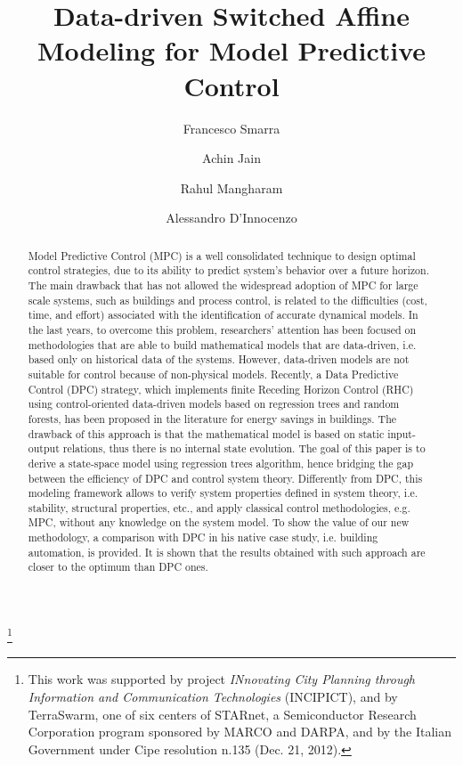 \documentclass[letterpaper, 10 pt, conference]{ifacconf}  %
\begin{document}
\begin{frontmatter}
	
	\title{Data-driven Switched Affine Modeling for Model Predictive Control} 
	
	\thanks[footnoteinfo]{This work was supported by project \emph{INnovating City Planning through Information and Communication Technologies} (INCIPICT), and by TerraSwarm, one of six centers of STARnet, a Semiconductor Research Corporation program sponsored by MARCO and DARPA, and by the Italian Government under Cipe resolution n.135 (Dec. 21, 2012).}
	
	\author[First,Second]{Francesco Smarra} 
	\author[Second]{Achin Jain} 
	\author[Second]{Rahul Mangharam}
	\author[First]{Alessandro D'Innocenzo}
	
	\address[First]{Department of Information Engineering, Computer Science and Mathematics, University of L'Aquila, Via Vetoio, Coppito, 67100 L'Aquila, Italy \\(e-mail: [francesco.smarra,alessandro.dinnocenzo]@univaq.it).}
	\address[Second]{Department of Electrical and Systems Engineering, University of Pennsylvania, 200 South 33rd Street, 19104 Philadelphia, PA, USA (e-mail: [achinj,rahulm]@seas.upenn.edu)}

\begin{abstract}
Model Predictive Control (MPC) is a well consolidated technique to design optimal control strategies, due to its ability to predict system’s behavior over a future horizon. The main drawback that has not allowed the widespread adoption of MPC for large scale systems, such as buildings and process control, is related to the difficulties (cost, time, and effort) associated with the identification of accurate dynamical models. In the last years, to overcome this problem, researchers' attention has been focused on methodologies that are able to build mathematical models that are data-driven, i.e. based only on historical data of the systems. However, data-driven models are not suitable for control because of non-physical models. Recently, a Data Predictive Control (DPC) strategy, which implements finite Receding Horizon Control (RHC) using control-oriented data-driven models based on regression trees and random forests, has been proposed in the literature for energy savings in buildings. The drawback of this approach is that the mathematical model is based on static input-output relations, thus there is no internal state evolution. The goal of this paper is to derive a state-space model using regression trees algorithm, hence bridging the gap between the efficiency of DPC and control system theory. Differently from DPC, this modeling framework allows to verify system properties defined in system theory, i.e. stability, structural properties, etc., and apply classical control methodologies, e.g. MPC, without any knowledge on the system model. To show the value of our new methodology, a comparison with DPC in his native case study, i.e. building automation, is provided. It is shown that the results obtained with such approach are closer to the optimum than DPC ones.
\end{abstract}


\end{frontmatter}
\end{document}
